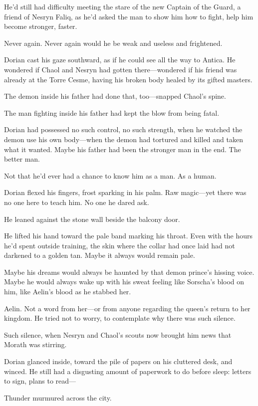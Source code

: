 He'd still had difficulty meeting the stare of the new Captain of the Guard, a friend of Nesryn Faliq, as he'd asked the man to show him how to fight, help him become stronger, faster.

Never again.
Never again would he be weak and useless and frightened.

Dorian cast his gaze southward, as if he could see all the way to Antica.
He wondered if Chaol and Nesryn had gotten there---wondered if his friend was already at the Torre Cesme, having his broken body healed by its gifted masters.

The demon inside his father had done that, too---snapped Chaol's spine.

The man fighting inside his father had kept the blow from being fatal.

Dorian had possessed no such control, no such strength, when he watched the demon use his own body---when the demon had tortured and killed and taken what it wanted.
Maybe his father had been the stronger man in the end.
The better man.

Not that he'd ever had a chance to know him as a man.
As a human.

Dorian flexed his fingers, frost sparking in his palm.
Raw magic---yet there was no one here to teach him.
No one he dared ask.

He leaned against the stone wall beside the balcony door.

He lifted his hand toward the pale band marking his throat.
Even with the hours he'd spent outside training, the skin where the collar had once laid had not darkened to a golden tan.
Maybe it always would remain pale.

Maybe his dreams would always be haunted by that demon prince's hissing voice.
Maybe he would always wake up with his sweat feeling like Sorscha's blood on him, like Aelin's blood as he stabbed her.

Aelin.
Not a word from her---or from anyone regarding the queen's return to her kingdom.
He tried not to worry, to contemplate why there was such silence.

Such silence, when Nesryn and Chaol's scouts now brought him news that Morath was stirring.

Dorian glanced inside, toward the pile of papers on his cluttered desk, and winced.
He still had a disgusting amount of paperwork to do before sleep: letters to sign, plans to read---

Thunder murmured across the city.

